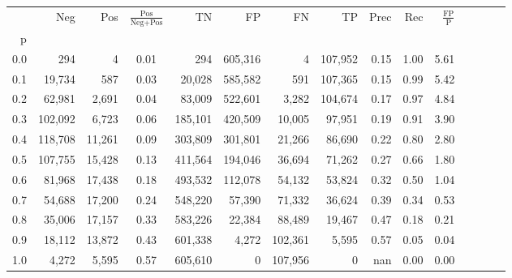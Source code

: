 \begin{tabular}{rrrcrrrrrrrrrrr}
\toprule
{} &      Neg &     Pos & $\frac{\text{Pos}}{\text{Neg}+\text{Pos}}$ &       TN &       FP &       FN &       TP &  Prec &   Rec & $\frac{\text{FP}}{\text{P}}$ \\
p   &          &         &                                            &          &          &          &          &       &       &                              \\
\midrule
0.0 &      294 &       4 &                                       0.01 &      294 &  605,316 &        4 &  107,952 &  0.15 &  1.00 &                         5.61 \\
0.1 &   19,734 &     587 &                                       0.03 &   20,028 &  585,582 &      591 &  107,365 &  0.15 &  0.99 &                         5.42 \\
0.2 &   62,981 &   2,691 &                                       0.04 &   83,009 &  522,601 &    3,282 &  104,674 &  0.17 &  0.97 &                         4.84 \\
0.3 &  102,092 &   6,723 &                                       0.06 &  185,101 &  420,509 &   10,005 &   97,951 &  0.19 &  0.91 &                         3.90 \\
0.4 &  118,708 &  11,261 &                                       0.09 &  303,809 &  301,801 &   21,266 &   86,690 &  0.22 &  0.80 &                         2.80 \\
0.5 &  107,755 &  15,428 &                                       0.13 &  411,564 &  194,046 &   36,694 &   71,262 &  0.27 &  0.66 &                         1.80 \\
0.6 &   81,968 &  17,438 &                                       0.18 &  493,532 &  112,078 &   54,132 &   53,824 &  0.32 &  0.50 &                         1.04 \\
0.7 &   54,688 &  17,200 &                                       0.24 &  548,220 &   57,390 &   71,332 &   36,624 &  0.39 &  0.34 &                         0.53 \\
0.8 &   35,006 &  17,157 &                                       0.33 &  583,226 &   22,384 &   88,489 &   19,467 &  0.47 &  0.18 &                         0.21 \\
0.9 &   18,112 &  13,872 &                                       0.43 &  601,338 &    4,272 &  102,361 &    5,595 &  0.57 &  0.05 &                         0.04 \\
1.0 &    4,272 &   5,595 &                                       0.57 &  605,610 &        0 &  107,956 &        0 &   nan &  0.00 &                         0.00 \\
\bottomrule
\end{tabular}
